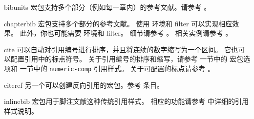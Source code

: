 \begin{marglist}
\item[bibunits]
 宏包支持多个部分（例如每一章内）的参考文献。请参考 。

\item[chapterbib]
 宏包支持多个部分的参考文献。
使用  环境和  filter 可以实现相应效果。
此外，你也可能需要  环境和  filter。
细节请参考 。
相关实例请参考 。

\item[cite]
 可以自动对引用编号进行排序，并且将连续的数字缩写为一个区间。
它也可以配置引用中的标点符号。
关于引用编号的排序和缩写，请参考  一节中的  宏包选项和  一节中的 \texttt{numeric-comp} 引用样式。
关于可配置的标点请参考 。

\item[citeref]
另一个可以创建反向引用的宏包。参考  条目。

\item[inlinebib]
 宏包用于脚注文献这种传统引用样式。
相应的功能请参考  中详细的引用样式说明。


\end{marglist}
